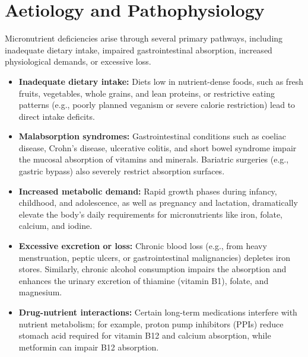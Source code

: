 \section*{Aetiology and Pathophysiology}
Micronutrient deficiencies arise through several primary pathways, including inadequate dietary intake, impaired gastrointestinal absorption, increased physiological demands, or excessive loss.
\begin{itemize}
    \item \textbf{Inadequate dietary intake:} Diets low in nutrient-dense foods, such as fresh fruits, vegetables, whole grains, and lean proteins, or restrictive eating patterns (e.g., poorly planned veganism or severe calorie restriction) lead to direct intake deficits.
    \item \textbf{Malabsorption syndromes:} Gastrointestinal conditions such as coeliac disease, Crohn's disease, ulcerative colitis, and short bowel syndrome impair the mucosal absorption of vitamins and minerals. Bariatric surgeries (e.g., gastric bypass) also severely restrict absorption surfaces.
    \item \textbf{Increased metabolic demand:} Rapid growth phases during infancy, childhood, and adolescence, as well as pregnancy and lactation, dramatically elevate the body's daily requirements for micronutrients like iron, folate, calcium, and iodine.
    \item \textbf{Excessive excretion or loss:} Chronic blood loss (e.g., from heavy menstruation, peptic ulcers, or gastrointestinal malignancies) depletes iron stores. Similarly, chronic alcohol consumption impairs the absorption and enhances the urinary excretion of thiamine (vitamin B1), folate, and magnesium.
    \item \textbf{Drug-nutrient interactions:} Certain long-term medications interfere with nutrient metabolism; for example, proton pump inhibitors (PPIs) reduce stomach acid required for vitamin B12 and calcium absorption, while metformin can impair B12 absorption.
\end{itemize}

